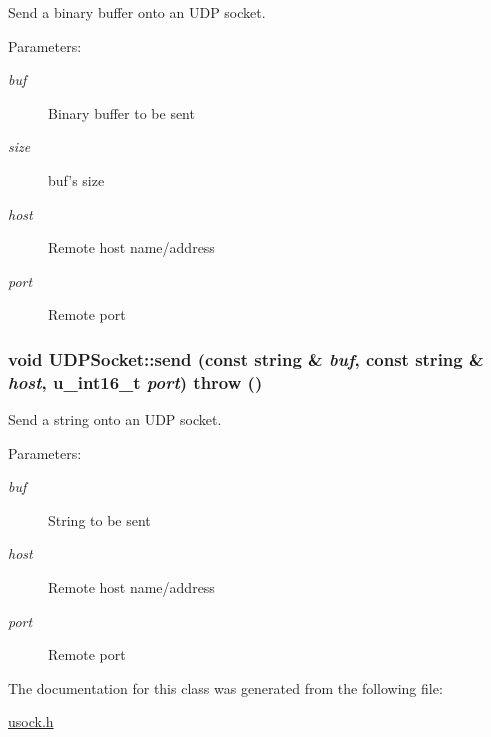 Send a binary buffer onto an UDP socket. 

\begin{Desc}
\item[Parameters:]
\begin{description}
\item[{\em buf}]Binary buffer to be sent \item[{\em size}]buf's size \item[{\em host}]Remote host name/address \item[{\em port}]Remote port \end{description}
\end{Desc}
\hypertarget{classUDPSocket_c7fbe4769e529544104649e6d9254d7d}{
\subsubsection[{send}]{\setlength{\rightskip}{0pt plus 5cm}void UDPSocket::send (const string \& {\em buf}, \/  const string \& {\em host}, \/  u\_\-int16\_\-t {\em port})  throw ()}}
\label{classUDPSocket_c7fbe4769e529544104649e6d9254d7d}


Send a string onto an UDP socket. 

\begin{Desc}
\item[Parameters:]
\begin{description}
\item[{\em buf}]String to be sent \item[{\em host}]Remote host name/address \item[{\em port}]Remote port \end{description}
\end{Desc}


The documentation for this class was generated from the following file:\begin{CompactItemize}
\item 
\hyperlink{usock_8h}{usock.h}\end{CompactItemize}

